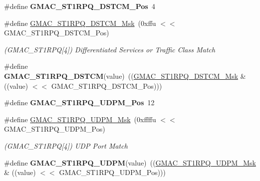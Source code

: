 \begin{DoxyCompactItemize}
\item 
\mbox{\label{group__SAME70__GMAC_gab19db4acb2952b5601fbf34ea4d69113}} 
\#define {\bfseries G\+M\+A\+C\+\_\+\+S\+T1\+R\+P\+Q\+\_\+\+D\+S\+T\+C\+M\+\_\+\+Pos}~4
\item 
\mbox{\label{group__SAME70__GMAC_ga925bc8b1978cd1f63470544451c01772}} 
\#define \mbox{\hyperlink{group__SAME70__GMAC_ga925bc8b1978cd1f63470544451c01772}{G\+M\+A\+C\+\_\+\+S\+T1\+R\+P\+Q\+\_\+\+D\+S\+T\+C\+M\+\_\+\+Msk}}~(0xffu $<$$<$ G\+M\+A\+C\+\_\+\+S\+T1\+R\+P\+Q\+\_\+\+D\+S\+T\+C\+M\+\_\+\+Pos)
\begin{DoxyCompactList}\small\item\em (G\+M\+A\+C\+\_\+\+S\+T1\+R\+PQ\mbox{[}4\mbox{]}) Differentiated Services or Traffic Class Match \end{DoxyCompactList}\item 
\mbox{\label{group__SAME70__GMAC_ga12a644661a3c9b5bada735b35b3fc816}} 
\#define {\bfseries G\+M\+A\+C\+\_\+\+S\+T1\+R\+P\+Q\+\_\+\+D\+S\+T\+CM}(value)~((\mbox{\hyperlink{group__SAMV71__GMAC_ga925bc8b1978cd1f63470544451c01772}{G\+M\+A\+C\+\_\+\+S\+T1\+R\+P\+Q\+\_\+\+D\+S\+T\+C\+M\+\_\+\+Msk}} \& ((value) $<$$<$ G\+M\+A\+C\+\_\+\+S\+T1\+R\+P\+Q\+\_\+\+D\+S\+T\+C\+M\+\_\+\+Pos)))
\item 
\mbox{\label{group__SAME70__GMAC_ga6d31b5329aa8ed5705ac4d67b7b12a2e}} 
\#define {\bfseries G\+M\+A\+C\+\_\+\+S\+T1\+R\+P\+Q\+\_\+\+U\+D\+P\+M\+\_\+\+Pos}~12
\item 
\mbox{\label{group__SAME70__GMAC_gacad8d7c77c2e77ee90c402350a8d23af}} 
\#define \mbox{\hyperlink{group__SAME70__GMAC_gacad8d7c77c2e77ee90c402350a8d23af}{G\+M\+A\+C\+\_\+\+S\+T1\+R\+P\+Q\+\_\+\+U\+D\+P\+M\+\_\+\+Msk}}~(0xffffu $<$$<$ G\+M\+A\+C\+\_\+\+S\+T1\+R\+P\+Q\+\_\+\+U\+D\+P\+M\+\_\+\+Pos)
\begin{DoxyCompactList}\small\item\em (G\+M\+A\+C\+\_\+\+S\+T1\+R\+PQ\mbox{[}4\mbox{]}) U\+DP Port Match \end{DoxyCompactList}\item 
\mbox{\label{group__SAME70__GMAC_gaa03804e93a3fcff558a7c508b566f16c}} 
\#define {\bfseries G\+M\+A\+C\+\_\+\+S\+T1\+R\+P\+Q\+\_\+\+U\+D\+PM}(value)~((\mbox{\hyperlink{group__SAMV71__GMAC_gacad8d7c77c2e77ee90c402350a8d23af}{G\+M\+A\+C\+\_\+\+S\+T1\+R\+P\+Q\+\_\+\+U\+D\+P\+M\+\_\+\+Msk}} \& ((value) $<$$<$ G\+M\+A\+C\+\_\+\+S\+T1\+R\+P\+Q\+\_\+\+U\+D\+P\+M\+\_\+\+Pos)))

\end{DoxyCompactItemize}
